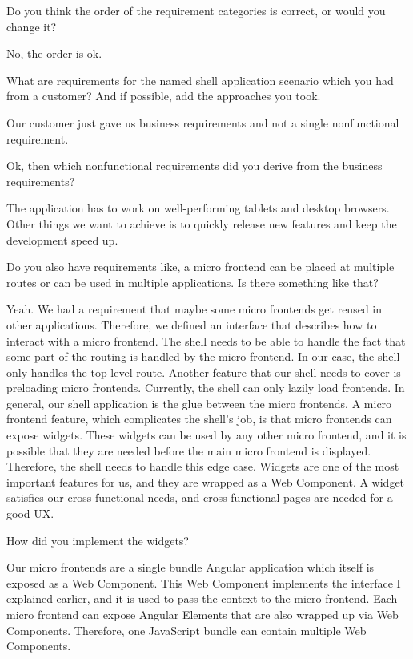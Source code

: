 \begin{description}
    \NicoVogel Do you think the order of the requirement categories is correct, or would you change it?

    \PirminRehm No, the order is ok.

    \NicoVogel What are requirements for the named shell application scenario which you had from a customer? And if possible, add the approaches you took.

    \PirminRehm Our customer just gave us business requirements and not a single nonfunctional requirement.

    \NicoVogel Ok, then which nonfunctional requirements did you derive from the business requirements?

    \PirminRehm The application has to work on well-performing tablets and desktop browsers. Other things we want to achieve is to quickly release new features and keep the development speed up.

    \NicoVogel Do you also have requirements like, a micro frontend can be placed at multiple routes or can be used in multiple applications. Is there something like that?

    \PirminRehm Yeah. We had a requirement that maybe some micro frontends get reused in other applications. Therefore, we defined an interface that describes how to interact with a micro frontend. The shell needs to be able to handle the fact that some part of the routing is handled by the micro frontend. In our case, the shell only handles the top-level route. Another feature that our shell needs to cover is preloading micro frontends. Currently, the shell can only lazily load frontends.
    In general, our shell application is the glue between the micro frontends. A micro frontend feature, which complicates the shell's job, is that micro frontends can expose widgets. These widgets can be used by any other micro frontend, and it is possible that they are needed before the main micro frontend is displayed. Therefore, the shell needs to handle this edge case. Widgets are one of the most important features for us, and they are wrapped as a Web Component. A widget satisfies our cross-functional needs, and cross-functional pages are needed for a good UX.

    \NicoVogel How did you implement the widgets?

    \PirminRehm Our micro frontends are a single bundle Angular application which itself is exposed as a Web Component. This Web Component implements the interface I explained earlier, and it is used to pass the context to the micro frontend. Each micro frontend can expose Angular Elements that are also wrapped up via Web Components. Therefore, one JavaScript bundle can contain multiple Web Components.


\end{description}
